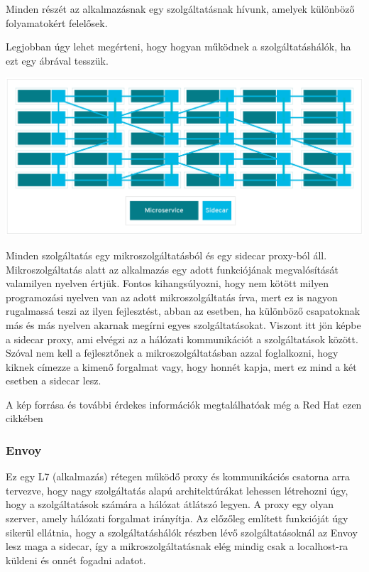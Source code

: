\documentclass[a4paper,oneside]{article}
\begin{document}
Minden részét az alkalmazásnak egy szolgáltatásnak hívunk, amelyek 
különböző folyamatokért felelősek. 

Legjobban úgy lehet megérteni, hogy hogyan működnek a szolgáltatáshálók, ha 
ezt egy ábrával tesszük. 
\begin{center}
\includegraphics[width=\textwidth]{serviceMesh}
\end{center}
Minden szolgáltatás egy mikroszolgáltatásból és egy sidecar proxy-ból áll. 
Mikroszolgáltatás alatt az alkalmazás egy adott funkciójának megvalósítását 
valamilyen nyelven értjük. Fontos kihangsúlyozni, hogy nem kötött milyen 
programozási nyelven van az adott mikroszolgáltatás írva, mert ez is 
nagyon rugalmassá teszi az ilyen fejlesztést, abban az esetben, ha 
különböző csapatoknak más és más nyelven akarnak megírni egyes szolgáltatásokat. 
Viszont itt jön képbe a sidecar proxy, ami elvégzi az a hálózati 
kommunikációt a szolgáltatások között. Szóval nem kell a fejlesztőnek 
a mikroszolgáltatásban azzal foglalkozni, hogy kiknek címezze a kimenő 
forgalmat vagy, hogy honnét kapja, mert ez mind a két esetben a sidecar lesz. 

A kép forrása és további érdekes információk megtalálhatóak még a Red Hat ezen 
cikkében ~\cite{redhat}

\subsubsection{Envoy}
Ez egy L7 (alkalmazás) rétegen működő proxy és kommunikációs csatorna 
arra tervezve, hogy nagy szolgáltatás alapú architektúrákat lehessen létrehozni 
úgy, hogy a szolgáltatások számára a hálózat átlátszó legyen.  
A proxy egy olyan szerver, amely hálózati forgalmat irányítja. Az előzőleg 
említett funkcióját úgy sikerül ellátnia, hogy a szolgáltatáshálók 
részben lévő szolgáltatásoknál az Envoy lesz maga a sidecar, így a 
mikroszolgáltatásnak elég mindig csak a localhost-ra küldeni és onnét 
fogadni adatot. 
\end{document}
